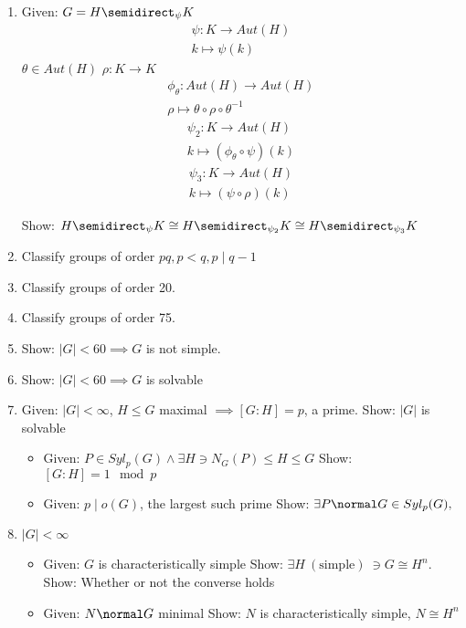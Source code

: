 \begin{enumerate}
\def\labelenumi{\arabic{enumi}.}
\item
  Given: \(G = H \semidirect_\psi K\)
  \begin{align*}\psi: K \rightarrow Aut(H) \\ k \mapsto \psi(k)\end{align*}
  \(\theta \in Aut(H)\) \(\rho: K \rightarrow K\)
  \begin{align*}\phi_\theta: Aut(H) \rightarrow Aut(H) \\ \rho \mapsto \theta \circ \rho \circ \theta^{-1}\end{align*}
  \begin{align*}\psi_2: K \rightarrow Aut(H) \\ k \mapsto (\phi_\theta \circ \psi)(k)\end{align*}
  \begin{align*}\psi_3: K \rightarrow Aut(H) \\ k \mapsto (\psi \circ \rho)(k)\end{align*}

  Show:
  \(H \semidirect_\psi K \cong H \semidirect_{\psi_2} K \cong H \semidirect_{\psi_3} K\)
\item
  Classify groups of order \(pq, p < q, p \mid q-1\)
\item
  Classify groups of order 20.
\item
  Classify groups of order 75.
\item
  Show: \(|G| < 60 \implies G\) is not simple.
\item
  Show: \(|G| < 60 \implies G\) is solvable
\item
  Given: \(|G| < \infty\), \(H \leq G\) maximal \(\implies [G:H] = p\),
  a prime. Show: \(|G|\) is solvable

  \begin{itemize}
  \tightlist
  \item
    Given: \(P \in Syl_p(G) \wedge \exists H \ni N_G(P) \leq H \leq G\)
    Show: \([G:H] = 1 \mod p\)
  \item
    Given: \(p \mid o(G)\), the largest such prime Show:
    \(\exists P \normal G \in Syl_p(G),\)
  \end{itemize}
\item
  \(|G| < \infty\)

  \begin{itemize}
  \tightlist
  \item
    Given: \(G\) is characteristically simple Show:
    \(\exists H~(\text{simple})~ \ni G \cong H^n\). Show: Whether or not
    the converse holds
  \item
    Given: \(N \normal G\) minimal Show: \(N\) is characteristically
    simple, \(N \cong H^n\)
  \end{itemize}
\end{enumerate}

